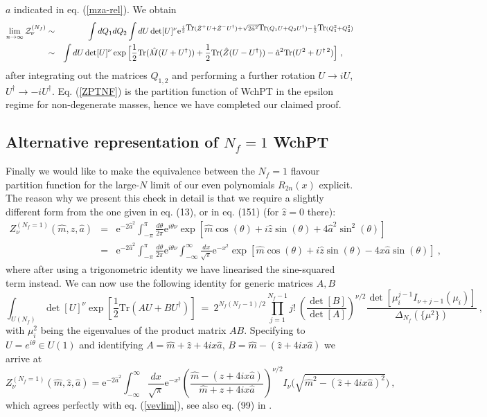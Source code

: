 \documentclass[11pt]{article}
\newcommand{\be}{\begin{equation}}
\newcommand{\ee}{\end{equation}}
\newcommand{\bea}{\begin{eqnarray}}
\newcommand{\eea}{\end{eqnarray}}
\newcommand{\nn}{\nonumber}
\newcommand{\e}{\mbox{e}}
\newcommand{\hm}{\hat{m}}
\newcommand{\hz}{\hat{z}}
\newcommand{\ha}{\hat{a}}
\def\Tr{{\mbox{Tr}}}
\begin{document}
\begin{appendix}
$a$ indicated in eq. (\ref{mza-rel}). We obtain 
\bea
\lim_{n\to\infty}{\cal Z}_{\nu}^{(N_f)}&\sim& \int dQ_1dQ_2\int dU \det[U]^\nu
\e^{\frac{i}{2}\Tr(\hat{Z}^+U+\hat{Z}^-U^\dag)+\sqrt{2\ha^2}\Tr(Q_1U+Q_2U^\dag)
-\frac12\Tr(Q_1^2+Q_2^2)}\nn\\
&\sim& \int dU \det[U]^\nu
\exp\Big[\frac{1}{2}\Tr(\hat{M}(U+U^\dag))
+\frac12\Tr(\hat{Z}(U-U^\dag))-\ha^2\Tr(U^2+U^{\dag\,2})\Big]\
,\ \ \ \ 
\label{ZPTNF}
\eea
after integrating out the matrices $Q_{1,2}$ and performing a further
rotation $U\to iU$, $U^\dag\to-iU^\dag$. Eq. (\ref{ZPTNF}) is the
partition function of WchPT in the epsilon regime for non-degenerate
masses, hence we have completed our claimed proof. 


\subsection{Alternative representation of $N_f=1$ WchPT}

Finally we would like to make the equivalence between the
$N_f=1$ flavour partition function for the
large-$N$ limit of our even polynomials $R_{2n}(x)$ explicit. The
reason why we present this check in detail is that we require a
slightly different form from the one given in \cite{DSV} eq. (13), or
in \cite{ADSV} eq. (151) (for $\hz=0$ there):
\bea
{Z}_\nu^{(N_f=1)}(\hm,\hz,\ha) &=& 
\e^{-2\ha^2}\int_{-\pi}^\pi \frac{d\theta}{2\pi} \e^{i\theta\nu}
\exp[\hm\cos(\theta)+i\hz\sin(\theta)+4\ha^2\sin^2(\theta)]\nn\\
&=& \e^{-2\ha^2}\int_{-\pi}^\pi \frac{d\theta}{2\pi} \e^{i\theta\nu}
\int_{-\infty}^\infty \frac{dx}{\sqrt{\pi}} \e^{-x^2}
\exp[\hm\cos(\theta)+i\hz\sin(\theta)-4x\ha\sin(\theta)]\ ,\ \ \ \ 
\eea
where after using a trigonometric identity we have linearised the
sine-squared term instead. 
We can now use the following identity \cite{BT} for generic matrices $A,B$
\be
\int_{U(N_f)}\det[U]^\nu\exp\left[\frac12 \Tr(AU+BU^\dag)\right]
\ =\
2^{N_f(N_f-1)/2}\prod_{j=1}^{N_f-1}j!\
\left(\frac{\det[B]}{\det[A]}\right)^{\nu/2}
\frac{\det[\mu_i^{j-1}I_{\nu+j-1}(\mu_i)]}
{\Delta_{N_f}(\{\mu^2\})}\ ,
\ee
with $\mu_i^2$ being the eigenvalues of the product matrix
$AB$. Specifying to $U=e^{i\theta}\in U(1)$ and identifying
$A=\hm+\hz+4ix\ha$, $B=\hm-(\hz+4ix\ha)$ we arrive at
\be
{Z}_\nu^{(N_f=1)}(\hm,\hz,\ha)  
= \e^{-2\ha^2}\int_{-\infty}^\infty \frac{dx}{\sqrt{\pi}} \e^{-x^2}
\left(\frac{\hm-(\hz+4ix\ha)}{\hm+\hz+4ix\ha}\right)^{\nu/2}
I_\nu\Big(\sqrt{\hm^2-(\hz+4ix\ha)^2} 
\Big)\ ,
\label{Z1lim}
\ee
which agrees perfectly with eq. (\ref{vevlim}), see also eq. (99) in
\cite{SV2011}. 





\end{appendix}
\end{document}
